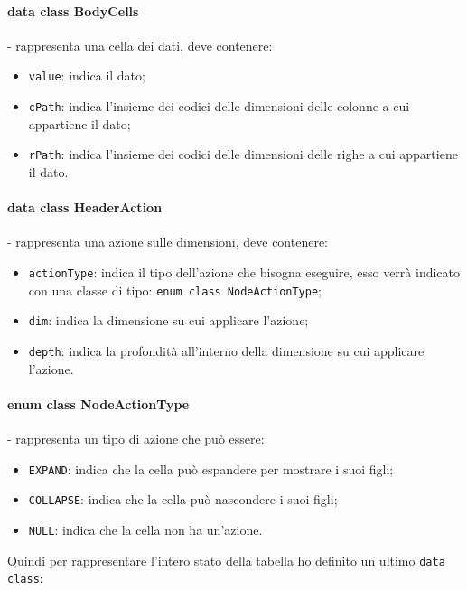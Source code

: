 \paragraph*{data class BodyCells}- rappresenta una cella dei dati, deve contenere:
\begin{itemize}
	\item \verb|value|: indica il dato;
	\item \verb|cPath|: indica l'insieme dei codici delle dimensioni delle colonne a cui appartiene il dato;
	\item \verb|rPath|: indica l'insieme dei codici delle dimensioni delle righe a cui appartiene il dato.
\end{itemize}	

\paragraph*{data class HeaderAction}- rappresenta una azione sulle dimensioni, deve contenere:
\begin{itemize}
	\item \verb|actionType|:  indica il tipo dell'azione che bisogna eseguire, esso verrà indicato con una classe di tipo: \verb|enum class NodeActionType|;
	\item \verb|dim|: indica la dimensione su cui applicare l'azione;
	\item \verb|depth|: indica la profondità all'interno della dimensione su cui applicare l'azione.
\end{itemize}

\paragraph*{enum class NodeActionType}- rappresenta un tipo di azione che può essere:
\begin{itemize}
	\item \verb|EXPAND|:  indica che la cella può espandere per mostrare i suoi figli;
	\item \verb|COLLAPSE|: indica che la cella può nascondere i suoi figli;
	\item \verb|NULL|: indica che la cella non ha un'azione.
\end{itemize}
\noindent
Quindi per rappresentare l'intero stato della tabella ho definito un ultimo \verb|data class|:
